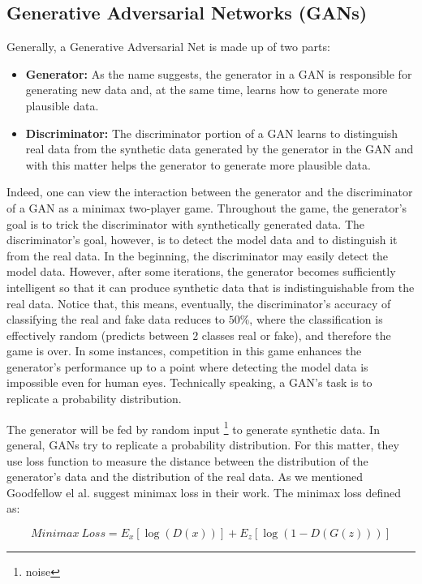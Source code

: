 \subsection{Generative Adversarial Networks (GANs)}
\label{tit:Generative-Adversarial-Network}
Generally, a Generative Adversarial Net is made up of two parts:
\begin{itemize}
  \item{\textbf{Generator:}} As the name suggests, the generator in a GAN is responsible for generating new data and, at the same time, learns how to generate more plausible data.
  \item{\textbf{Discriminator:}} The discriminator portion of a GAN learns to distinguish real data from the synthetic data generated
        by the generator in the GAN and with this matter helps the generator to generate more plausible data.
\end{itemize}

Indeed, one can view the interaction between the generator and the discriminator of a GAN as a
minimax two-player game. Throughout the game, the generator's goal is to trick the discriminator
with synthetically generated data. The discriminator's goal, however, is to detect the model data
and to distinguish it from the real data. In the beginning, the discriminator may easily detect the
model data. However, after some iterations, the generator becomes sufficiently intelligent so that
it can produce synthetic data that is indistinguishable from the real data. Notice that, this means,
eventually, the discriminator's accuracy of classifying the real and fake data reduces to $50\%$,
where the classification is effectively random (predicts between $2$ classes
real or fake), and therefore the game is over. In some instances,
competition in this game enhances the generator's performance up to a point where detecting the
model data is impossible even for human eyes.
Technically speaking,  a GAN's task is to replicate a probability distribution.

The generator will be fed by random input \footnote{noise} to generate synthetic data. In general, GANs try to replicate a probability distribution. For this matter, they use loss function to measure the distance between the distribution of the generator's data and the distribution of the real data. As we mentioned Goodfellow el al. \cite{goodflew_bayesian_approach} suggest minimax loss in their work. The minimax loss defined as:

\begin{equation} \label{eq:minimax_loss}
  Minimax\ Loss = E_{x}[\log (D(x))]+E_{z}[\log (1-D(G(z)))]
\end{equation}


